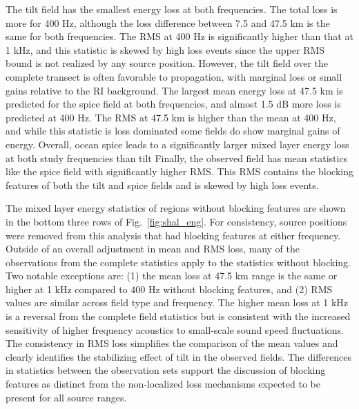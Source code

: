 \documentclass[preprint,NumberedRefs]{JASA}
\begin{document}
The tilt field has the smallest energy loss at both frequencies. The total loss is more for 400 Hz, although the loss difference between 7.5 and 47.5 km is the same for both frequencies. The RMS at 400 Hz is significantly higher than that at 1 kHz, and this statistic is skewed by high loss events since the upper RMS bound is not realized by any source position. However, the tilt field over the complete transect is often favorable to propagation, with marginal loss or small gains relative to the RI background. The largest mean energy loss at 47.5 km is predicted for the spice field at both frequencies, and almost 1.5 dB more loss is predicted at 400 Hz. The RMS at 47.5 km is higher than the mean at 400 Hz, and while this statistic is loss dominated some fields do show marginal gains of energy. Overall, ocean spice leads to a significantly larger mixed layer energy loss at both study frequencies than tilt  Finally, the observed field has mean statistics like the spice field with significantly higher RMS. This RMS contains the blocking features of both the tilt and spice fields and is skewed by high loss events.

The mixed layer energy statistics of regions without blocking features are shown in the bottom three rows of Fig.~\ref{fig:shal_eng}. For consistency, source positions were removed from this analysis that had blocking features at either frequency. Outside of an overall adjustment in mean and RMS loss, many of the observations from the complete statistics apply to the statistics without blocking. Two notable exceptions are: (1) the mean loss at 47.5 km range is the same or higher at 1 kHz compared to 400 Hz without blocking features, and (2) RMS values are similar across field type and frequency. The higher mean loss at 1 kHz is a reversal from the complete field statistics but is consistent with the increased sensitivity of higher frequency acoustics to small-scale sound speed fluctuations. The consistency in RMS loss simplifies the comparison of the mean values and clearly identifies the stabilizing effect of tilt in the observed fields. The differences in statistics between the observation sets support the discussion of blocking features as distinct from the non-localized loss mechanisms expected to be present for all source ranges.
\end{document}
